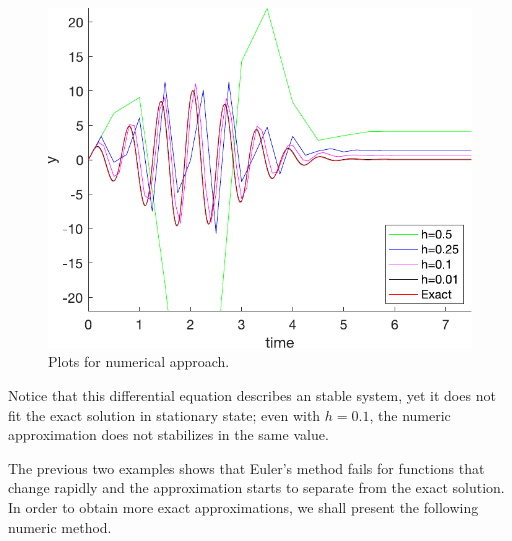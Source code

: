 \begin{figure}[H]
    \centering
    \includegraphics[scale=0.5]{files/example3Euler.pdf}
    \caption{Plots for numerical approach.}
    \label{fig:ex3euler}
\end{figure}

Notice that this differential equation describes an stable system, yet it does not fit the exact solution in stationary state; even with $h=0.1$, the numeric approximation does not stabilizes in the same value.

The previous two examples shows that Euler's method fails for functions that change rapidly and the approximation starts to separate from the exact solution. In order to obtain more exact approximations, we shall present the following numeric method.
